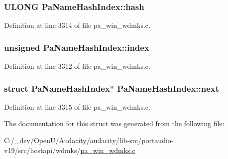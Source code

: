 \subsubsection[{\texorpdfstring{hash}{hash}}]{\setlength{\rightskip}{0pt plus 5cm}U\+L\+O\+NG Pa\+Name\+Hash\+Index\+::hash}\hypertarget{struct_pa_name_hash_index_a6895320b6d2e45ee368d72704a3ee334}{}\label{struct_pa_name_hash_index_a6895320b6d2e45ee368d72704a3ee334}


Definition at line 3314 of file pa\+\_\+win\+\_\+wdmks.\+c.

\subsubsection[{\texorpdfstring{index}{index}}]{\setlength{\rightskip}{0pt plus 5cm}unsigned Pa\+Name\+Hash\+Index\+::index}\hypertarget{struct_pa_name_hash_index_a50ce2b35427378c04b50ec6d2fb214bf}{}\label{struct_pa_name_hash_index_a50ce2b35427378c04b50ec6d2fb214bf}


Definition at line 3312 of file pa\+\_\+win\+\_\+wdmks.\+c.

\subsubsection[{\texorpdfstring{next}{next}}]{\setlength{\rightskip}{0pt plus 5cm}struct {\bf Pa\+Name\+Hash\+Index}$\ast$ Pa\+Name\+Hash\+Index\+::next}\hypertarget{struct_pa_name_hash_index_aff49b9db6ce618e8bc7f43ad863e37fd}{}\label{struct_pa_name_hash_index_aff49b9db6ce618e8bc7f43ad863e37fd}


Definition at line 3315 of file pa\+\_\+win\+\_\+wdmks.\+c.



The documentation for this struct was generated from the following file\+:\begin{DoxyCompactItemize}
\item 
C\+:/\+\_\+dev/\+Open\+U/\+Audacity/audacity/lib-\/src/portaudio-\/v19/src/hostapi/wdmks/\hyperlink{pa__win__wdmks_8c}{pa\+\_\+win\+\_\+wdmks.\+c}\end{DoxyCompactItemize}
